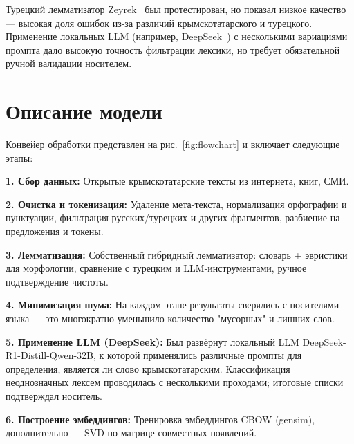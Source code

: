 \documentclass{article}
\begin{document}
Турецкий лемматизатор Zeyrek~\cite{zeyreklem} был протестирован, но показал низкое качество — высокая доля ошибок из-за различий крымскотатарского и турецкого.
Применение локальных LLM (например, DeepSeek~\cite{deepseek2024}) с несколькими вариациями промпта дало высокую точность фильтрации лексики, но требует обязательной ручной валидации носителем.

\section{Описание модели}
Конвейер обработки представлен на рис.~\ref{fig:flowchart} и включает следующие этапы:

\textbf{1. Сбор данных:}
Открытые крымскотатарские тексты из интернета, книг, СМИ.

\textbf{2. Очистка и токенизация:}
Удаление мета-текста, нормализация орфографии и пунктуации, фильтрация русских/турецких и других фрагментов, разбиение на предложения и токены.

\textbf{3. Лемматизация:}
Собственный гибридный лемматизатор: словарь + эвристики для морфологии, сравнение с турецким и LLM-инструментами, ручное подтверждение чистоты.

\textbf{4. Минимизация шума:}
На каждом этапе результаты сверялись с носителями языка — это многократно уменьшило количество "мусорных" и лишних слов.

\textbf{5. Применение LLM (DeepSeek):}
Был развёрнут локальный LLM DeepSeek-R1-Distill-Qwen-32B, к которой применялись различные промпты для определения, является ли слово крымскотатарским. Классификация неоднозначных лексем проводилась с несколькими проходами; итоговые списки подтверждал носитель.

\textbf{6. Построение эмбеддингов:}
Тренировка эмбеддингов CBOW (gensim), дополнительно — SVD по матрице совместных появлений.
\end{document}
